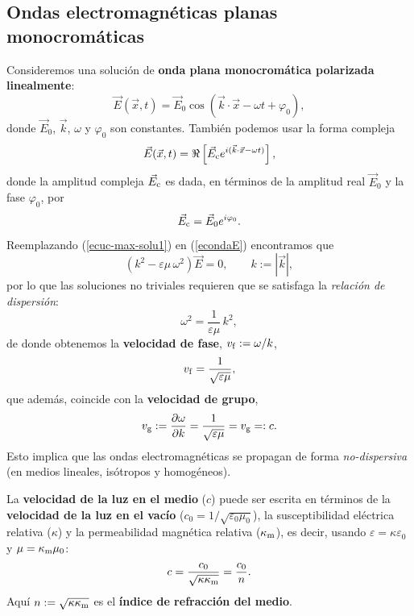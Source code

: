\subsection{Ondas electromagnéticas planas monocromáticas}
Consideremos una solución de \textbf{onda plana monocromática polarizada linealmente}:
\begin{equation}
\vec{E}(\vec{x},t)=\vec{E}_0 \cos\left(\vec{k}\cdot\vec{x}-\omega t+\varphi_0\right),
\label{ecuc-max-solu1}%
\end{equation}
donde $\vec{E}_0$, $\vec{k}$, $\omega$ y $\varphi_0$ son constantes. También podemos usar la forma compleja
\begin{equation}
\vec{E}(\vec{x},t)=\Re\left[\vec{E}_{\rm c} e^{i(\vec{k}\cdot\vec{x}-\omega t)}\right],
\label{opmc}%
\end{equation}
donde la amplitud compleja $\vec{E}_{\rm c}$ es dada, en términos de la amplitud real $\vec{E}_0$ y la fase $\varphi_0$, por
\begin{equation}
\vec{E}_{\rm c} = \vec{E}_0 e^{i\varphi_0}.
\end{equation}
Reemplazando (\ref{ecuc-max-solu1}) en (\ref{econdaE}) encontramos que%
\begin{equation}
\left(k^2-\varepsilon\mu\,\omega^2\right)  \vec{E}=0, \qquad k:=|\vec{k}|,
\end{equation}
por lo que las soluciones no triviales requieren que se satisfaga la
\textit{relación de dispersión}:
\begin{equation}
\omega^2=\frac{1}{\varepsilon\mu}\,k^2, \label{rdoem}
\end{equation}
de donde obtenemos la \textbf{velocidad de fase},
$v_{\rm f}:=\omega/k$,
\begin{equation}
v_{\rm f}=\frac{1}{\sqrt{\varepsilon\mu}},
\end{equation}
que además, coincide con la \textbf{velocidad de grupo}, 
\begin{equation}
v_{\rm g} := \frac{\partial\omega}{\partial k}=\frac{1}{\sqrt{\varepsilon\mu}}=v_{\rm g}=:c.
\end{equation}
Esto implica que las ondas electromagnéticas se propagan de forma \textit{no-dispersiva} (en medios lineales, isótropos y homogéneos). 

La \textbf{velocidad de la luz en el medio} ($c$) puede ser escrita en términos de la \textbf{velocidad de la luz en el vacío} ($c_0=1/\sqrt{\varepsilon_0\mu_0}$), la susceptibilidad eléctrica relativa ($\kappa$) y la permeabilidad magnética relativa ($\kappa_{\rm m}$), es decir, usando $\varepsilon=\kappa\varepsilon_0$ y $\mu=\kappa_{\rm m}\mu_0$:
\begin{equation}
c=\frac{c_0}{\sqrt{\kappa\kappa_{\rm m}}}=\frac{c_0}{n}.
\end{equation}
Aquí $n:=\sqrt{\kappa\kappa_{\rm m}}$ es el \textbf{índice de refracción del medio}.

